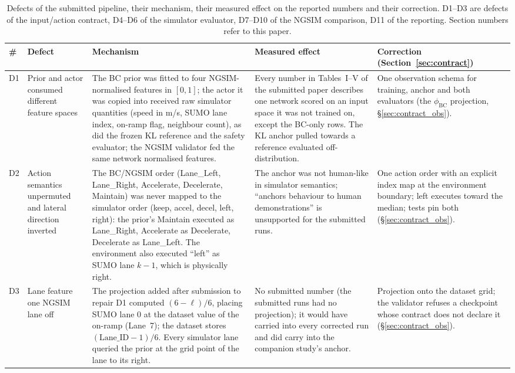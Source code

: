 \begin{table}[!t]
\centering
\footnotesize
\caption{Defects of the submitted pipeline, their mechanism, their measured effect on the reported numbers and their correction. D1--D3 are defects of the input/action contract, D4--D6 of the simulator evaluator, D7--D10 of the NGSIM comparison, D11 of the reporting. Section numbers refer to this paper.}
\label{tab:t1_defects}
\setlength{\tabcolsep}{4pt}
\begin{tabular}{@{}>{\raggedright\arraybackslash}p{}>{\raggedright\arraybackslash}p{}>{\raggedright\arraybackslash}p{}>{\raggedright\arraybackslash}p{}>{\raggedright\arraybackslash}p{}@{}}
\toprule
\# & Defect & Mechanism & Measured effect & Correction (Section~\ref{sec:contract}) \\
\midrule
D1 & Prior and actor consumed different feature spaces & The BC prior was fitted to four NGSIM-normalised features in $[0,1]$; the actor it was copied into received raw simulator quantities (speed in m/s, SUMO lane index, on-ramp flag, neighbour count), as did the frozen KL reference and the safety evaluator; the NGSIM validator fed the same network normalised features. & Every number in Tables~I--V of the submitted paper describes one network scored on an input space it was not trained on, except the BC-only rows. The KL anchor pulled towards a reference evaluated off-distribution. & One observation schema for training, anchor and both evaluators (the $\phi_{\mathrm{BC}}$ projection, \S\ref{sec:contract_obs}). \\
D2 & Action semantics unpermuted and lateral direction inverted & The BC/NGSIM order (Lane\_Left, Lane\_Right, Accelerate, Decelerate, Maintain) was never mapped to the simulator order (keep, accel, decel, left, right): the prior's Maintain executed as Lane\_Right, Accelerate as Decelerate, Decelerate as Lane\_Left. The environment also executed ``left'' as SUMO lane $k-1$, which is physically right. & The anchor was not human-like in simulator semantics; ``anchors behaviour to human demonstrations'' is unsupported for the submitted runs. & One action order with an explicit index map at the environment boundary; left executes toward the median; tests pin both (\S\ref{sec:contract_obs}). \\
D3 & Lane feature one NGSIM lane off & The projection added after submission to repair D1 computed $(6-\ell)/6$, placing SUMO lane 0 at the dataset value of the on-ramp (Lane~7); the dataset stores $(\mathrm{Lane\_ID}-1)/6$. Every simulator lane queried the prior at the grid point of the lane to its right. & No submitted number (the submitted runs had no projection); it would have carried into every corrected run and did carry into the companion study's anchor. & Projection onto the dataset grid; the validator refuses a checkpoint whose contract does not declare it (\S\ref{sec:contract_obs}). \\

\end{tabular}
\end{table}
